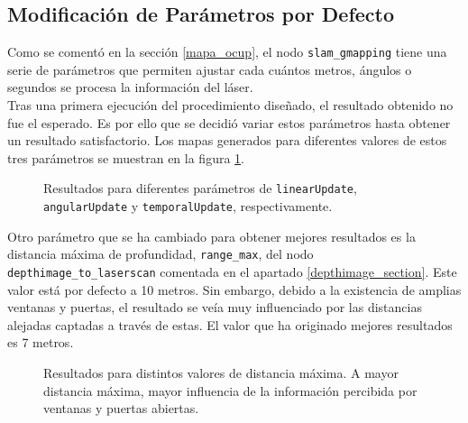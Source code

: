\subsection{Modificación de Parámetros por Defecto}

Como se comentó en la sección \ref{mapa_ocup}, el nodo \texttt{slam\_gmapping} tiene una serie de parámetros que permiten ajustar cada cuántos metros, ángulos o segundos se procesa la información del láser.\\

Tras una primera ejecución del procedimiento diseñado, el resultado obtenido no fue el esperado. Es por ello que se decidió variar estos parámetros hasta obtener un resultado satisfactorio. Los mapas generados para diferentes valores de estos tres parámetros se muestran en la figura \ref{fig:scans_params}.\\

\begin{figure}[H]
 \centering
 \caption{Resultados para diferentes parámetros de \texttt{linearUpdate}, \texttt{angularUpdate} y \texttt{temporalUpdate}, respectivamente.}
 \label{fig:scans_params}
\end{figure}

Otro parámetro que se ha cambiado para obtener mejores resultados es la distancia máxima de profundidad, \texttt{range\_max}, del nodo \texttt{depthimage\_to\_laserscan} comentada en el apartado \ref{depthimage_section}. Este valor está por defecto a 10 metros. Sin embargo, debido a la existencia de amplias ventanas y puertas, el resultado se veía muy influenciado por las distancias alejadas captadas a través de estas. El valor que ha originado mejores resultados es 7 metros.\\

\begin{figure}[H]
 \centering
 \caption{Resultados para distintos valores de distancia máxima. A mayor distancia máxima, mayor influencia de la información percibida por ventanas y puertas abiertas.}
 \label{fig:scans_range}
\end{figure}


